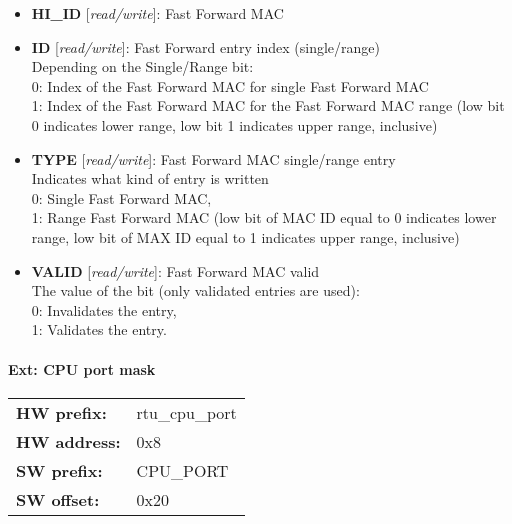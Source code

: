 \begin{itemize}
\item \begin{small}
{\bf 
HI\_ID
} [\emph{read/write}]: Fast Forward MAC
\end{small}
\item \begin{small}
{\bf 
ID
} [\emph{read/write}]: Fast Forward entry index (single/range)
\\
Depending on the Single/Range bit: \\                 0: Index of the Fast Forward MAC for single Fast Forward MAC\\                 1: Index of the Fast Forward MAC for the Fast Forward MAC range (low bit 0 indicates lower range, low bit 1 indicates upper range, inclusive) 
\end{small}
\item \begin{small}
{\bf 
TYPE
} [\emph{read/write}]: Fast Forward MAC single/range entry
\\
Indicates what kind of entry is written \\                 0: Single Fast Forward MAC,\\                 1: Range Fast Forward MAC (low bit of MAC ID equal to 0 indicates lower range, low bit of MAX ID equal to 1 indicates upper range, inclusive) 
\end{small}
\item \begin{small}
{\bf 
VALID
} [\emph{read/write}]: Fast Forward MAC valid
\\
The value of the bit (only validated entries are used):\\                 0: Invalidates the entry,\\                 1: Validates the entry.
\end{small}
\end{itemize}
\paragraph*{Ext: CPU port mask}\vspace{12pt}

\begin{tabular}{l l }
{\bf HW prefix:}  & rtu\_cpu\_port\\
{\bf HW address:}  & 0x8\\
{\bf SW prefix:}  & CPU\_PORT\\
{\bf SW offset:}  & 0x20\\
\end{tabular}

